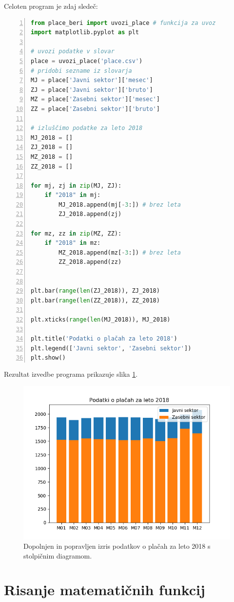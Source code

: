 Celoten program je zdaj sledeč:
\begin{lstlisting}[language=Python, showstringspaces=false,numbers=left]
from place_beri import uvozi_place # funkcija za uvoz
import matplotlib.pyplot as plt

# uvozi podatke v slovar
place = uvozi_place('place.csv')
# pridobi sezname iz slovarja
MJ = place['Javni sektor']['mesec']
ZJ = place['Javni sektor']['bruto']
MZ = place['Zasebni sektor']['mesec']
ZZ = place['Zasebni sektor']['bruto']

# izluščimo podatke za leto 2018
MJ_2018 = []
ZJ_2018 = []
MZ_2018 = []
ZZ_2018 = []

for mj, zj in zip(MJ, ZJ):
    if "2018" in mj:
        MJ_2018.append(mj[-3:]) # brez leta
        ZJ_2018.append(zj)

for mz, zz in zip(MZ, ZZ):
    if "2018" in mz:
        MZ_2018.append(mz[-3:]) # brez leta
        ZZ_2018.append(zz)


plt.bar(range(len(ZJ_2018)), ZJ_2018)
plt.bar(range(len(ZZ_2018)), ZZ_2018)

plt.xticks(range(len(MJ_2018)), MJ_2018)

plt.title('Podatki o plačah za leto 2018')
plt.legend(['Javni sektor', 'Zasebni sektor'])
plt.show()
\end{lstlisting}
Rezultat izvedbe programa prikazuje slika \ref{img:plt7}.
\begin{figure}
    \includegraphics[width=\linewidth]{img/plt7.png}
    \caption{Dopolnjen in popravljen izris podatkov o plačah za leto 2018 s stolpičnim diagramom.}
    \label{img:plt7}
\end{figure}



\section{Risanje matematičnih funkcij}
